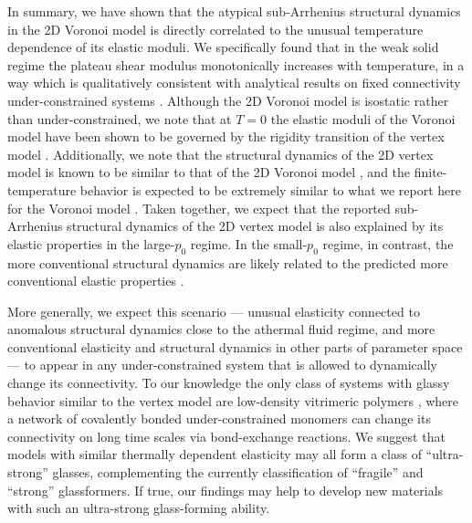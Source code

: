 \documentclass[aps,reprint,superscriptaddress,nofootinbib, notitlepage,prl]{revtex4-2}
\begin{document}
In summary, we have shown that the atypical sub-Arrhenius structural dynamics in the 2D Voronoi model is directly correlated to the unusual temperature dependence of its elastic moduli.
We specifically found that in the weak solid regime the plateau shear modulus monotonically increases with temperature, in a way which is qualitatively consistent with analytical results on fixed connectivity under-constrained systems \cite{lee2023generic,lee2023partition}.
Although the 2D Voronoi model is isostatic rather than under-constrained, we note that at $T=0$ the elastic moduli of the Voronoi model have been shown to be governed by the rigidity transition of the vertex model \cite{sussman2018no}.
Additionally, we note that the structural dynamics of the 2D vertex model is known to be similar to that of the 2D Voronoi model \cite{sussman2018anomalous}, and the finite-temperature behavior is expected to be extremely similar to what we report here for the Voronoi model \cite{lee2023generic,lee2023partition}.
Taken together, we expect that the reported sub-Arrhenius structural dynamics of the 2D vertex model is also explained by its elastic properties in the large-$p_0$ regime.
In the small-$p_0$ regime, in contrast, the more conventional structural dynamics \cite{Pandey2024} are likely related to the predicted more conventional elastic properties \cite{lee2023generic,lee2023partition}.

More generally, we expect this scenario --- unusual elasticity connected to anomalous structural dynamics close to the athermal fluid regime, and more conventional elasticity and structural dynamics in other parts of parameter space --- to appear in any under-constrained system that is allowed to dynamically change its connectivity.
To our knowledge the only class of systems with glassy behavior similar to the vertex model are low-density vitrimeric polymers \cite{ciarella2019understanding}, where a network of covalently bonded under-constrained monomers can change its connectivity on long time scales via bond-exchange reactions.
We suggest that models with similar thermally dependent elasticity may all form a class of ``ultra-strong'' glasses, complementing the currently classification of ``fragile'' and ``strong'' glassformers.
If true, our findings may help to develop new materials with such an ultra-strong glass-forming ability.
\end{document}
